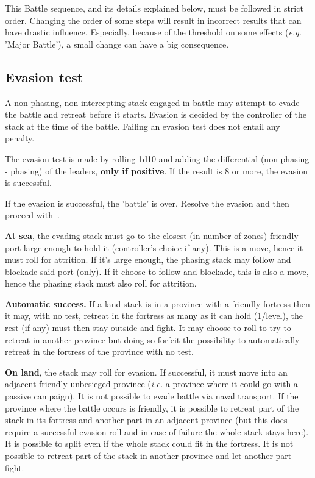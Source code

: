 This Battle sequence, and its details explained below, must be followed in
strict order. Changing the order of some steps will result in incorrect
results that can have drastic influence. Especially, because of the threshold
on some effects (\emph{e.g.} 'Major Battle'), a small change can have a big
consequence.

\subsection{Evasion test}
\label{chMilitary:Battle:Evasion}
A non-phasing, non-intercepting stack engaged in battle may attempt to evade
the battle and retreat before it starts. Evasion is decided by the controller
of the stack at the time of the battle. Failing an evasion test does not
entail any penalty.

The evasion test is made by rolling 1d10 and adding the \Man differential
(non-phasing - phasing) of the leaders, \textbf{only if positive}. If the
result is 8 or more, the evasion is successful.

If the evasion is successful, the 'battle' is over. Resolve the evasion and
then proceed with~.

\textbf{At sea}, the evading stack must go to the closest (in number of zones)
friendly port large enough to hold it (controller's choice if any). This is a
move, hence it must roll for attrition. If it's large enough, the phasing
stack may follow and blockade said port (only). If it choose to follow and
blockade, this is also a move, hence the phasing stack must also roll for
attrition.

\textbf{Automatic success.} If a land stack is in a province with a friendly
fortress then it may, with no test, retreat in the fortress as many \LD as it
can hold (1/level), the rest (if any) must then stay outside and fight. It may
choose to roll to try to retreat in another province but doing so forfeit the
possibility to automatically retreat in the fortress of the province with no
test.

\textbf{On land}, the stack may roll for evasion. If successful, it must move
into an adjacent friendly unbesieged province (\emph{i.e.} a province where it
could go with a passive campaign). It is not possible to evade battle via
naval transport. If the province where the battle occurs is friendly, it is
possible to retreat part of the stack in its fortress and another part in an
adjacent province (but this does require a successful evasion roll and in case
of failure the whole stack stays here). It is possible to split even if the
whole stack could fit in the fortress. It is not possible to retreat part of
the stack in another province and let another part fight.


